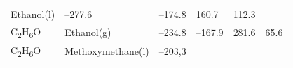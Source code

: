 \documentclass[
  9pt,
]{extbook}
\theoremstyle{definition}
\theoremstyle{definition}
\theoremstyle{definition}
\theoremstyle{remark}
\begin{document}
\begin{longtable}[]{@{}llllll@{}}
\begin{minipage}[t]{0.17\columnwidth}
Ethanol(l)\strut
\end{minipage} & \begin{minipage}[t]{0.15\columnwidth}\raggedright
--277.6\strut
\end{minipage} & \begin{minipage}[t]{0.15\columnwidth}\raggedright
--174.8\strut
\end{minipage} & \begin{minipage}[t]{0.14\columnwidth}\raggedright
160.7\strut
\end{minipage} & \begin{minipage}[t]{0.14\columnwidth}\raggedright
112.3\strut
\end{minipage}\tabularnewline
\begin{minipage}[t]{0.07\columnwidth}\raggedright
C\textsubscript{2}H\textsubscript{6}O\strut
\end{minipage} & \begin{minipage}[t]{0.17\columnwidth}\raggedright
Ethanol(g)\strut
\end{minipage} & \begin{minipage}[t]{0.15\columnwidth}\raggedright
--234.8\strut
\end{minipage} & \begin{minipage}[t]{0.15\columnwidth}\raggedright
--167.9\strut
\end{minipage} & \begin{minipage}[t]{0.14\columnwidth}\raggedright
281.6\strut
\end{minipage} & \begin{minipage}[t]{0.14\columnwidth}\raggedright
65.6\strut
\end{minipage}\tabularnewline
\begin{minipage}[t]{0.07\columnwidth}\raggedright
C\textsubscript{2}H\textsubscript{6}O\strut
\end{minipage} & \begin{minipage}[t]{0.17\columnwidth}\raggedright
Methoxymethane(l)\strut
\end{minipage} & \begin{minipage}[t]{0.15\columnwidth}\raggedright
--203,3\strut
\end{minipage} & \begin{minipage}[t]{0.15\columnwidth}\raggedright
\strut
\end{minipage} & \begin{minipage}[t]{0.14\columnwidth}\raggedright
\strut
\end{minipage} & \begin{minipage}[t]{0.14\columnwidth}\raggedright

\end{minipage}
\end{longtable}
\end{document}
